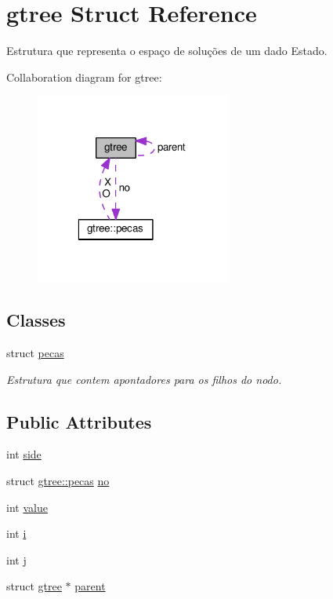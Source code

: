 \hypertarget{structgtree}{\section{gtree Struct Reference}
\label{structgtree}
}


Estrutura que representa o espaço de soluções de um dado Estado.  




Collaboration diagram for gtree\+:
\nopagebreak
\begin{figure}[H]
\begin{center}
\leavevmode
\includegraphics[width=183pt]{structgtree__coll__graph}
\end{center}
\end{figure}
\subsection*{Classes}
\begin{DoxyCompactItemize}
\item 
struct \hyperlink{structgtree_1_1pecas}{pecas}
\begin{DoxyCompactList}\small\item\em Estrutura que contem apontadores para os filhos do nodo. \end{DoxyCompactList}\end{DoxyCompactItemize}
\subsection*{Public Attributes}
\begin{DoxyCompactItemize}
\item 
int \hyperlink{structgtree_aa846f96e7fe88d420efe940ba26600b1}{side}
\item 
struct \hyperlink{structgtree_1_1pecas}{gtree\+::pecas} \hyperlink{structgtree_a9f38e15f251baa31c64e318434d17b0a}{no}
\item 
int \hyperlink{structgtree_a0eb754f1a6a1ffb0318bf6a37cdabba1}{value}
\item 
int \hyperlink{structgtree_adc3b4827f553f4791f357b0dfa35909c}{i}
\item 
int \hyperlink{structgtree_a27e5ef16fc462e2cc8a22f32ed74c4d7}{j}
\item 
struct \hyperlink{structgtree}{gtree} $\ast$ \hyperlink{structgtree_ac1cb61353a3071797136ae875d897c8d}{parent}
\end{DoxyCompactItemize}


